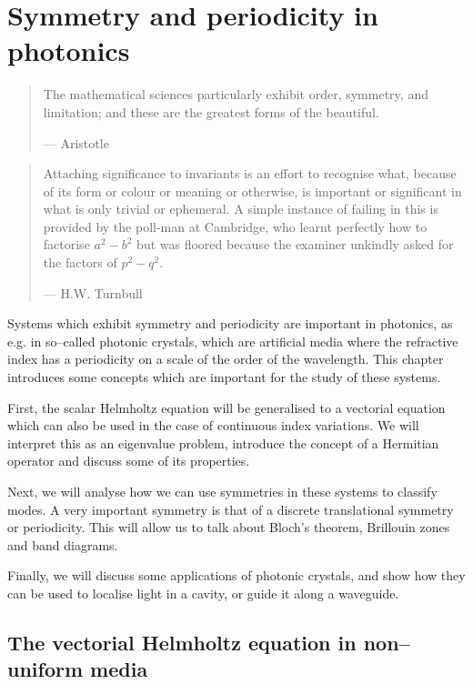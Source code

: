 \setcounter{chapter}{3} %

\chapter{Symmetry and periodicity in photonics}
\label{h:periodic}

\begin{quote}
The mathematical sciences particularly exhibit order, symmetry, and limitation; and these are the greatest forms of the beautiful.

--- Aristotle
\end{quote}

\begin{quote}
Attaching significance to invariants is an effort to recognise what, because of its form or colour or meaning or otherwise, is important or significant in what is only trivial or ephemeral. A simple instance of failing in this is provided by the poll-man at Cambridge, who learnt perfectly how to factorise $a^2 - b^2$ but was floored because the examiner unkindly asked for the factors of $p^2 - q^2$.

--- H.W. Turnbull
\end{quote}

\minitoc

Systems which exhibit symmetry and periodicity are important in photonics, as e.g. in so--called photonic crystals, which are artificial media where the refractive index has a periodicity on a scale of the order of the wavelength. This chapter introduces some concepts which are important for the study of these systems.

First, the scalar Helmholtz equation will be generalised to a vectorial equation which can also be used in the case of continuous index variations. We will interpret this as an eigenvalue problem, introduce the concept of a Hermitian operator and discuss some of its properties.

Next, we will analyse how we can use symmetries in these systems to classify modes. A very important symmetry is that of a discrete translational symmetry or periodicity. This will allow us to talk about Bloch's theorem, Brillouin zones and band diagrams. 

Finally, we will discuss some applications of photonic crystals, and show how they can be used to localise light in a cavity, or guide it along a waveguide.

\section{The vectorial Helmholtz equation in non--uniform media}

